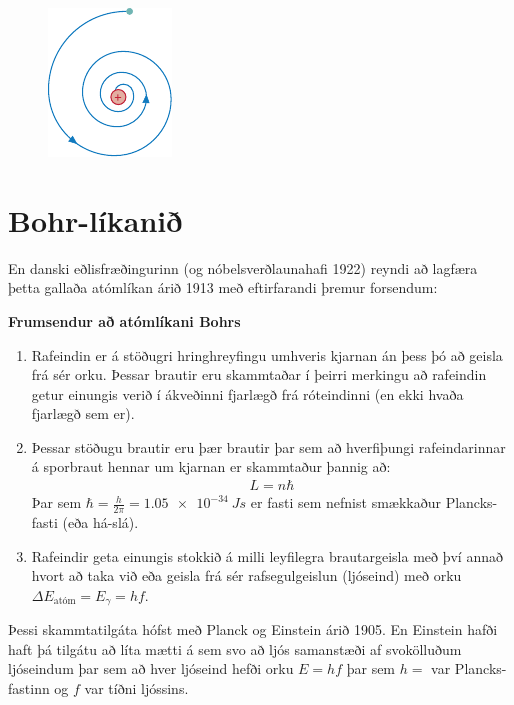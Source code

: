 \ifdefined \wholebook \else\documentclass[oneside]{book}\usepackage{EdlBook}\graphicspath{{figures/}}
\begin{document}
\begin{figure}[H]
    \centering
    \includegraphics{figures/spirala.pdf}
\end{figure}

\section{Bohr-líkanið}

En danski eðlisfræðingurinn (og nóbelsverðlaunahafi 1922) reyndi að lagfæra þetta gallaða atómlíkan árið 1913 með eftirfarandi þremur forsendum:

\begin{tcolorbox}
\textbf{Frumsendur að atómlíkani Bohrs}
\begin{enumerate}[label = \textbf{(\roman*)}]
    \item Rafeindin er á stöðugri hringhreyfingu umhveris kjarnan án þess þó að geisla frá sér orku. Þessar brautir eru skammtaðar í þeirri merkingu að rafeindin getur einungis verið í ákveðinni fjarlægð frá róteindinni (en ekki hvaða fjarlægð sem er).
    
    \item Þessar stöðugu brautir eru þær brautir þar sem að hverfiþungi rafeindarinnar á sporbraut hennar um kjarnan er skammtaður þannig að:
    \begin{align*}
        L = n \hbar 
    \end{align*}
    Þar sem $\hbar = \frac{h}{2\pi} = \SI{1.05e-34}{Js}$ er fasti sem nefnist smækkaður Plancks-fasti (eða há-slá).
    
    \item Rafeindir geta einungis stokkið á milli leyfilegra brautargeisla með því annað hvort að taka við eða geisla frá sér rafsegulgeislun (ljóseind) með orku $\Delta E_{\text{atóm}} = E_\gamma = hf$.
\end{enumerate}
\end{tcolorbox}

Þessi skammtatilgáta hófst með Planck og Einstein árið 1905. En Einstein hafði haft þá tilgátu að líta mætti á sem svo að ljós samanstæði af svokölluðum ljóseindum þar sem að hver ljóseind hefði orku $E = hf$ þar sem $h = $ var Plancks-fastinn og $f$ var tíðni ljóssins.
\end{document}
